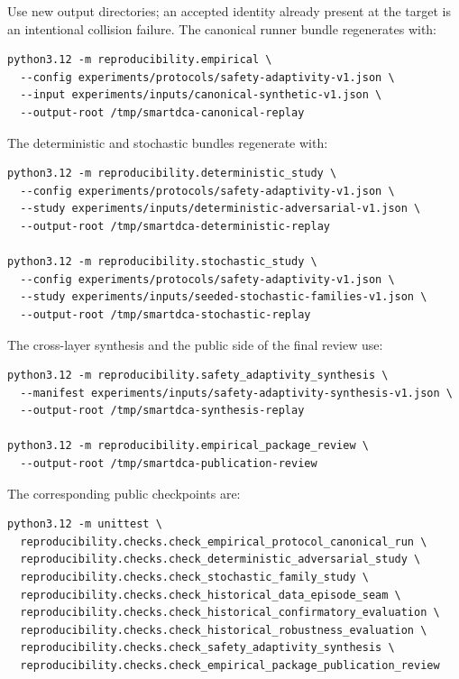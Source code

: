\documentclass[12pt,a4paper,oneside]{report}
\begin{document}
Use new output directories; an accepted identity already present at the target
is an intentional collision failure. The canonical runner bundle regenerates
with:

\begin{verbatim}
python3.12 -m reproducibility.empirical \
  --config experiments/protocols/safety-adaptivity-v1.json \
  --input experiments/inputs/canonical-synthetic-v1.json \
  --output-root /tmp/smartdca-canonical-replay
\end{verbatim}

The deterministic and stochastic bundles regenerate with:

\begin{verbatim}
python3.12 -m reproducibility.deterministic_study \
  --config experiments/protocols/safety-adaptivity-v1.json \
  --study experiments/inputs/deterministic-adversarial-v1.json \
  --output-root /tmp/smartdca-deterministic-replay

python3.12 -m reproducibility.stochastic_study \
  --config experiments/protocols/safety-adaptivity-v1.json \
  --study experiments/inputs/seeded-stochastic-families-v1.json \
  --output-root /tmp/smartdca-stochastic-replay
\end{verbatim}

The cross-layer synthesis and the public side of the final review use:

\begin{verbatim}
python3.12 -m reproducibility.safety_adaptivity_synthesis \
  --manifest experiments/inputs/safety-adaptivity-synthesis-v1.json \
  --output-root /tmp/smartdca-synthesis-replay

python3.12 -m reproducibility.empirical_package_review \
  --output-root /tmp/smartdca-publication-review
\end{verbatim}

The corresponding public checkpoints are:

\begin{verbatim}
python3.12 -m unittest \
  reproducibility.checks.check_empirical_protocol_canonical_run \
  reproducibility.checks.check_deterministic_adversarial_study \
  reproducibility.checks.check_stochastic_family_study \
  reproducibility.checks.check_historical_data_episode_seam \
  reproducibility.checks.check_historical_confirmatory_evaluation \
  reproducibility.checks.check_historical_robustness_evaluation \
  reproducibility.checks.check_safety_adaptivity_synthesis \
  reproducibility.checks.check_empirical_package_publication_review
\end{verbatim}
\end{document}
